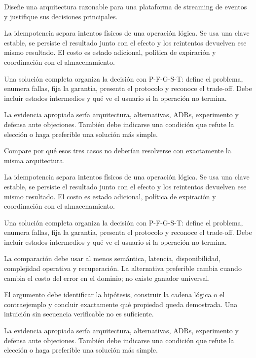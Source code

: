 \documentclass[variant=guia,cover=institutional,mode=screen]{ua-engineering-v6-article}
\begin{document}
\begin{uaexercise}
Diseñe una arquitectura razonable para una plataforma de streaming de eventos y justifique sus decisiones principales.
\end{uaexercise}
\begin{uaanswer}
La idempotencia separa intentos físicos de una operación lógica. Se usa una clave estable, se persiste el resultado junto con el efecto y los reintentos devuelven ese mismo resultado. El costo es estado adicional, política de expiración y coordinación con el almacenamiento.

Una solución completa organiza la decisión con P-F-G-S-T: define el problema, enumera fallas, fija la garantía, presenta el protocolo y reconoce el trade-off. Debe incluir estados intermedios y qué ve el usuario si la operación no termina.

La evidencia apropiada sería arquitectura, alternativas, ADRs, experimento y defensa ante objeciones. También debe indicarse una condición que refute la elección o haga preferible una solución más simple.
\end{uaanswer}

\begin{uaexercise}
Compare por qué esos tres casos no deberían resolverse con exactamente la misma arquitectura.
\end{uaexercise}
\begin{uaanswer}
La idempotencia separa intentos físicos de una operación lógica. Se usa una clave estable, se persiste el resultado junto con el efecto y los reintentos devuelven ese mismo resultado. El costo es estado adicional, política de expiración y coordinación con el almacenamiento.

Una solución completa organiza la decisión con P-F-G-S-T: define el problema, enumera fallas, fija la garantía, presenta el protocolo y reconoce el trade-off. Debe incluir estados intermedios y qué ve el usuario si la operación no termina.

La comparación debe usar al menos semántica, latencia, disponibilidad, complejidad operativa y recuperación. La alternativa preferible cambia cuando cambia el costo del error en el dominio; no existe ganador universal.

El argumento debe identificar la hipótesis, construir la cadena lógica o el contraejemplo y concluir exactamente qué propiedad queda demostrada. Una intuición sin secuencia verificable no es suficiente.

La evidencia apropiada sería arquitectura, alternativas, ADRs, experimento y defensa ante objeciones. También debe indicarse una condición que refute la elección o haga preferible una solución más simple.
\end{uaanswer}
\end{document}
